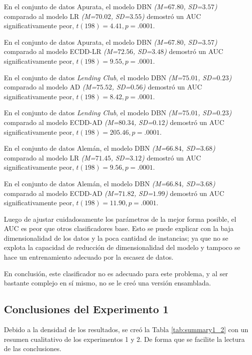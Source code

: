 En el conjunto de datos Apurata, el modelo DBN \textit{(M=$67.80$, SD=$3.57$)} comparado al modelo \ac{LR} \textit{(M=$70.02$, SD=$3.55$)} demostró un \ac{AUC} significativamente peor, $t(198)=4.41, p=.0001$.

En el conjunto de datos Apurata, el modelo DBN \textit{(M=$67.80$, SD=$3.57$)} comparado al modelo ECDD-LR \textit{(M=$72.56$, SD=$3.48$)} demostró un \ac{AUC} significativamente peor, $t(198)=9.55, p=.0001$.

En el conjunto de datos \textit{Lending Club}, el modelo DBN \textit{(M=$75.01$, SD=$0.23$)} comparado al modelo \ac{AD} \textit{(M=$75.52$, SD=$0.56$)} demostró un \ac{AUC} significativamente peor, $t(198)=8.42, p=.0001$.

En el conjunto de datos \textit{Lending Club}, el modelo DBN \textit{(M=$75.01$, SD=$0.23$)} comparado al modelo ECDD-AD \textit{(M=$80.34$, SD=$0.12$)} demostró un \ac{AUC} significativamente peor, $t(198)=205.46, p=.0001$.

En el conjunto de datos Alemán, el modelo DBN \textit{(M=$66.84$, SD=$3.68$)} comparado al modelo \ac{LR} \textit{(M=$71.45$, SD=$3.12$)} demostró un \ac{AUC} significativamente peor, $t(198)=9.56, p=.0001$.

En el conjunto de datos Alemán, el modelo DBN \textit{(M=$66.84$, SD=$3.68$)} comparado al modelo ECDD-AD \textit{(M=$71.82$, SD=$1.99$)} demostró un \ac{AUC} significativamente peor, $t(198)=11.90, p=.0001$.

Luego de ajustar cuidadosamente los parámetros de la mejor forma posible, el \ac{AUC} es peor que otros clasificadores base. Esto se puede explicar con la baja dimensionalidad de los datos y la poca cantidad de instancias; ya que no se explota la capacidad de reducción de dimensionalidad del modelo y tampoco se hace un entrenamiento adecuado por la escasez de datos.

En conclusión, este clasificador no es adecuado para este problema, y al ser bastante complejo en sí mismo, no se le creó una versión ensamblada.


\subsection{Conclusiones del Experimento 1}

Debido a la densidad de los resultados, se creó la Tabla \ref{tab:summary1_2} con un resumen cualitativo de los experimentos 1 y 2. De forma que se facilite la lectura de las conclusiones.

